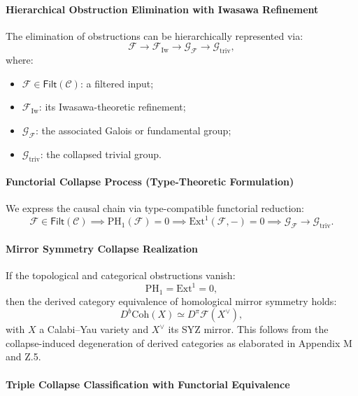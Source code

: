 \documentclass[11pt]{article}
\begin{document}
\paragraph{Hierarchical Obstruction Elimination with Iwasawa Refinement}

The elimination of obstructions can be hierarchically represented via:
\[
\mathcal{F} \longrightarrow \mathcal{F}_{\mathrm{Iw}} \longrightarrow \mathcal{G}_{\mathcal{F}} \longrightarrow \mathcal{G}_{\mathrm{triv}},
\]
where:
\begin{itemize}
    \item \( \mathcal{F} \in \mathsf{Filt}(\mathcal{C}) \): a filtered input;
    \item \( \mathcal{F}_{\mathrm{Iw}} \): its Iwasawa-theoretic refinement;
    \item \( \mathcal{G}_{\mathcal{F}} \): the associated Galois or fundamental group;
    \item \( \mathcal{G}_{\mathrm{triv}} \): the collapsed trivial group.
\end{itemize}

\paragraph{Functorial Collapse Process (Type-Theoretic Formulation)}

We express the causal chain via type-compatible functorial reduction:
\[
\mathcal{F} \in \mathsf{Filt}(\mathcal{C}) \implies
\mathrm{PH}_1(\mathcal{F}) = 0 \implies
\mathrm{Ext}^1(\mathcal{F}, -) = 0 \implies
\mathcal{G}_{\mathcal{F}} \longrightarrow \mathcal{G}_{\mathrm{triv}}.
\]

\paragraph{Mirror Symmetry Collapse Realization}

If the topological and categorical obstructions vanish:
\[
\mathrm{PH}_1 = \mathrm{Ext}^1 = 0,
\]
then the derived category equivalence of homological mirror symmetry holds:
\[
D^b\mathrm{Coh}(X) \simeq D^\pi\mathcal{F}(X^\vee),
\]
with \( X \) a Calabi–Yau variety and \( X^\vee \) its SYZ mirror. This follows from the collapse-induced degeneration of derived categories as elaborated in Appendix M and Z.5.

\paragraph{Triple Collapse Classification with Functorial Equivalence}
\end{document}

